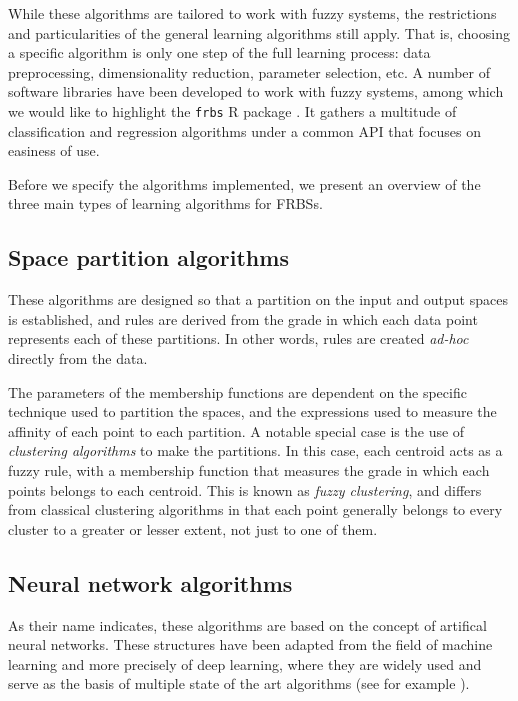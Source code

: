 While these algorithms are tailored to work with fuzzy systems, the restrictions and particularities of the general learning algorithms still apply. That is, choosing a specific algorithm is only one step of the full learning process: data preprocessing, dimensionality reduction, parameter selection, etc. A number of software libraries have been developed to work with fuzzy systems, among which we would like to highlight the \verb|frbs| R package \cite{riza2015frbs}. It gathers a multitude of classification and regression algorithms under a common API that focuses on easiness of use.

Before we specify the algorithms implemented, we present an overview of the three main types of learning algorithms for FRBSs.

\subsection{Space partition algorithms}

These algorithms are designed so that a partition on the input and output spaces is established, and rules are derived from the grade in which each data point represents each of these partitions. In other words, rules are created \textit{ad-hoc} directly from the data.

The parameters of the membership functions are dependent on the specific technique used to partition the spaces, and the expressions used to measure the affinity of each point to each partition. A notable special case is the use of \textit{clustering algorithms} to make the partitions. In this case, each centroid acts as a fuzzy rule, with a membership function that measures the grade in which each points belongs to each centroid. This is known as \textit{fuzzy clustering}, and differs from classical clustering algorithms in that each point generally belongs to every cluster to a greater or lesser extent, not just to one of them.

\subsection{Neural network algorithms}

As their name indicates, these algorithms are based on the concept of artifical neural networks. These structures have been adapted from the field of machine learning and more precisely of deep learning, where they are widely used and serve as the basis of multiple state of the art algorithms (see for example \cite{lecun2015deep}).

